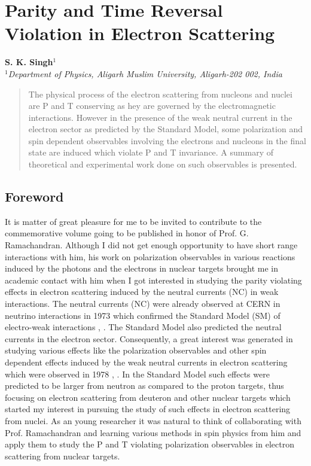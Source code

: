 \chapter{Parity and Time Reversal Violation in Electron Scattering}\label{chap9}


\begin{center}
\textbf{S. K. Singh}$^{1}$\\
{}$^{1}$\textit{Department of Physics, Aligarh Muslim University, Aligarh-202 002, India} 
\end{center}

\begin{quote}
The physical process of the electron scattering from nucleons and nuclei are P and T conserving as hey are governed by the electromagnetic interactions. However in the presence of the weak neutral current in the electron sector as predicted by the Standard Model, some polarization and spin dependent observables involving the electrons and nucleons in the final state are induced which violate P and T invariance. A summary of theoretical and experimental work done on such observables is presented.
\end{quote}


\section{Foreword}\label{chap9-sec1}
It is matter of great pleasure for me to be invited to contribute to the commemorative volume going to be published in honor of Prof. G. Ramachandran.  Although I did not get enough opportunity to have short range interactions with him, his work on polarization observables in various reactions induced by the photons and the electrons in nuclear targets brought me in academic contact with him when I got interested in studying the parity violating effects in electron scattering induced by the neutral currents (NC) in weak interactions. The neutral currents (NC) were already observed at CERN in neutrino interactions in 1973 \cite{key1} which confirmed the Standard Model (SM) of electro-weak interactions \cite{key2}, \cite{key3}. The Standard Model also predicted the neutral currents in the electron sector.  Consequently, a great interest was generated in studying various effects like the polarization observables and other  spin dependent effects induced by the weak  neutral currents in electron scattering which were observed in 1978 \cite{key4}, \cite{key5}. In the Standard Model such effects were predicted to be  larger from neutron as compared to the proton targets, thus focusing on electron scattering from   deuteron and other nuclear targets which started my interest in pursuing the study of such effects in electron scattering from nuclei.  As an young researcher it was natural to think of collaborating with Prof. Ramachandran and learning various methods in  spin physics from him and apply them to study the P and T violating polarization observables in electron scattering from nuclear targets. 

